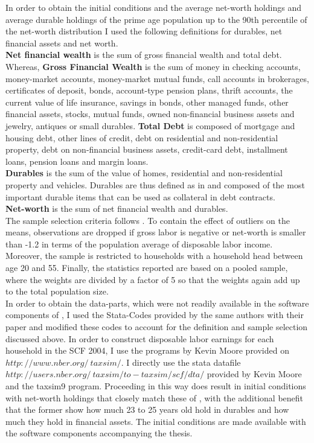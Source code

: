 \documentclass[a4paper,12pt,legno]{article}
\begin{document}
In order to obtain the initial conditions and the average net-worth holdings and average durable holdings of the prime age population up to the 90th percentile of the net-worth distribution I used the following definitions for durables, net financial assets and net worth. \\
\textbf{Net financial wealth} is the sum of gross financial wealth and total debt. Whereas, \textbf{Gross Financial Wealth} is the sum of money in checking accounts, money-market accounts, money-market mutual funds, call accounts in brokerages, certificates of deposit, bonds, account-type pension plans, thrift accounts, the current value of life insurance, savings in bonds, other managed funds, other financial assets, stocks, mutual funds, owned non-financial business assets and jewelry, antiques or small durables.
\textbf{Total Debt} is composed of mortgage and housing debt, other lines of credit, debt on residential and non-residential property, debt on non-financial business assets, credit-card debt, installment loans, pension loans and margin loans.\\
\textbf{Durables} is the sum of the value of homes, residential and non-residential property and vehicles. Durables are thus defined as in \cite{hintermaier2010} and composed of the most important durable items that can be used as collateral in debt contracts. \\  \textbf{Net-worth} is the sum of net financial wealth and durables.  \\
The sample selection criteria follows \cite{hintermaier2011}. To contain the effect of outliers on the means, observations are dropped if gross labor is negative or net-worth is smaller than -1.2 in terms of the population average of disposable labor income. Moreover, the sample is restricted to households with a household head between age 20 and 55. 
Finally, the statistics reported are based on a pooled sample, where the weights are divided by a factor of 5 so that the weights again add up to the total population size. \\
In order to obtain the data-parts, which were not readily available in the software components of \cite{hintermaier2011}, I used the Stata-Codes provided by the same authors with their paper \cite{hintermaier2016} and modified these codes to account for the definition and sample selection discussed above. In order to construct disposable labor earnings for each household in the SCF 2004, I use the programs by Kevin Moore provided on $http://www.nber.org/~taxsim/$.  I directly use the stata datafile $http://users.nber.org/~taxsim/to-taxsim/scf/dta/$ provided by Kevin Moore and the taxsim9 program. Proceeding in this way does result in initial conditions with net-worth holdings that closely match these of \cite{hintermaier2011}, with the additional benefit that the former show how much 23 to 25 years old hold in durables and how much they hold in financial assets. The initial conditions are made available with the software components accompanying the thesis.
\end{document}
